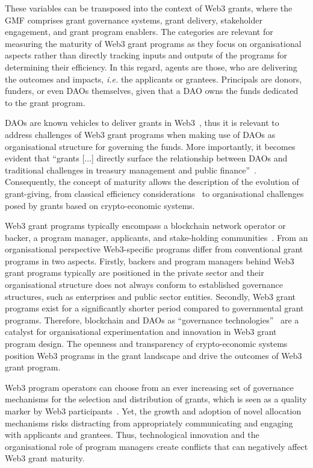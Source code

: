\documentclass[conference]{IEEEtran}
\begin{document}
These variables can be transposed into the context of Web3 grants, where the GMF comprises grant governance systems, grant delivery, stakeholder engagement, and grant program enablers. The categories are relevant for measuring the maturity of Web3 grant programs as they focus on organisational aspects rather than directly tracking inputs and outputs of the programs for determining their efficiency. In this regard, agents are those, who are delivering the outcomes and impacts, \textit{i.e.} the applicants or grantees. Principals are donors, funders, or even DAOs themselves, given that a DAO owns the funds dedicated to the grant program.

DAOs are known vehicles to deliver grants in Web3~\cite{austgen_dao_2023}, thus it is relevant to address challenges of Web3 grant programs when making use of DAOs as organisational structure for governing the funds. More importantly, it becomes evident that ``grants [...] directly surface the relationship between DAOs and traditional challenges in treasury management and public finance''~\cite[p.~27]{tan_open_2023}. Consequently, the concept of maturity allows the description of the evolution of grant-giving, from classical efficiency considerations~\cite{holmstrom_agency_1989} to organisational challenges posed by grants based on crypto-economic systems.

Web3 grant programs typically encompass a blockchain network operator or backer, a program manager, applicants, and stake-holding communities~\cite{gilbert_sustainable_2019,howell_financing_2017}. From an organisational perspective Web3-specific programs differ from conventional grant programs in two aspects. Firstly, backers and program managers behind Web3 grant programs typically are positioned in the private sector and their organisational structure does not always conform to established governance structures, such as enterprises and public sector entities. Secondly, Web3 grant programs exist for a significantly shorter period compared to governmental grant programs. Therefore, blockchain and DAOs as ``governance technologies''~\cite{brekke_hacker-engineers_2021,shermin_disrupting_2017}  are a catalyst for organisational experimentation and innovation in Web3 grant program design. The openness and transparency of crypto-economic systems~\cite[p.~54]{santos_dao_2018} position Web3 programs in the grant landscape and drive the outcomes of Web3 grant program.

Web3 program operators can choose from an ever increasing set of governance mechanisms for the selection and distribution of grants, which is seen as a quality marker by Web3 participants~\cite{owocki_gitcoin_2024}. Yet, the growth and adoption of novel allocation mechanisms risks distracting from appropriately communicating and engaging with applicants and grantees. Thus, technological innovation and the organisational role of program managers create conflicts that can negatively affect Web3 grant maturity.
\end{document}
